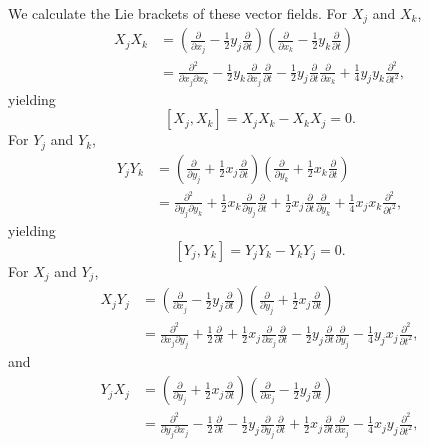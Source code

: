 \documentclass{article}
\theoremstyle{definition}
\theoremstyle{definition}
\begin{document}
We  calculate the Lie brackets of these vector fields. For $X_j$ and $X_k$,
\begin{align*}
X_j X_k &= \left(\frac{\partial}{\partial x_j} - \frac{1}{2}y_j \frac{\partial}{\partial t}\right)
\left( \frac{\partial}{\partial x_k} - \frac{1}{2}y_k \frac{\partial}{\partial t}\right)\\
&=\frac{\partial^2}{\partial x_j \partial x_k} - \frac{1}{2} y_k \frac{\partial}{\partial x_j} \frac{\partial}{\partial t}
-\frac{1}{2}y_j \frac{\partial}{\partial t} \frac{\partial}{\partial x_k} + \frac{1}{4} y_j y_k \frac{\partial^2}{\partial t^2},
\end{align*}
yielding
\[
[X_j,X_k] = X_jX_k-X_kX_j = 0.
\]
For $Y_j$ and $Y_k$,
\begin{align*}
Y_j Y_k&=\left( \frac{\partial}{\partial y_j} + \frac{1}{2}x_j \frac{\partial}{\partial t}\right)
\left( \frac{\partial}{\partial y_k} + \frac{1}{2}x_k \frac{\partial}{\partial t}\right)\\
&=\frac{\partial^2}{\partial y_j \partial y_k} +\frac{1}{2} x_k \frac{\partial}{\partial y_j} \frac{\partial}{\partial t}
+\frac{1}{2}x_j \frac{\partial}{\partial t} \frac{\partial}{\partial y_k}
+\frac{1}{4} x_jx_k \frac{\partial^2}{\partial t^2},
\end{align*}
yielding
\[
[Y_j,Y_k] = Y_jY_k-Y_kY_j=0.
\]
For $X_j$ and $Y_j$,
\begin{align*}
X_j Y_j&=\left( \frac{\partial}{\partial x_j} - \frac{1}{2}y_j \frac{\partial}{\partial t}\right)
\left(\frac{\partial}{\partial y_j} + \frac{1}{2}x_j \frac{\partial}{\partial t}\right)\\
&=\frac{\partial^2}{\partial x_j \partial y_j} +\frac{1}{2}\frac{\partial}{\partial t}
+\frac{1}{2} x_j \frac{\partial}{\partial x_j} \frac{\partial}{\partial t}
-\frac{1}{2}y_j \frac{\partial}{\partial t} \frac{\partial}{\partial y_j}
-\frac{1}{4}y_j x_j \frac{\partial^2}{\partial t^2},
\end{align*}
and
\begin{align*}
Y_jX_j&=\left(\frac{\partial}{\partial y_j} + \frac{1}{2}x_j \frac{\partial}{\partial t}\right)\left( \frac{\partial}{\partial x_j} - \frac{1}{2}y_j \frac{\partial}{\partial t}\right)\\
&=\frac{\partial^2}{\partial y_j \partial x_j} - \frac{1}{2}\frac{\partial}{\partial t}
-\frac{1}{2}y_j \frac{\partial}{\partial y_j} \frac{\partial}{\partial t}
+\frac{1}{2} x_j \frac{\partial}{\partial t} \frac{\partial}{\partial x_j}
-\frac{1}{4}x_jy_j \frac{\partial^2}{\partial t^2},
\end{align*}
\end{document}

